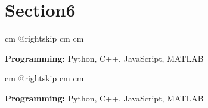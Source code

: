 \documentclass[10pt, letterpaper]{article}
\begin{document}
    
    \section{Section6}

        \begingroup{} cm
        \advance\csname @rightskip cm
        \advance{} cm

        \textbf{Programming:} Python, C++, JavaScript, MATLAB \par\endgroup

        \vspace{0.2 cm}
        \begingroup{} cm
        \advance\csname @rightskip cm
        \advance{} cm

        \textbf{Programming:} Python, C++, JavaScript, MATLAB \par\endgroup


    
\end{document}
